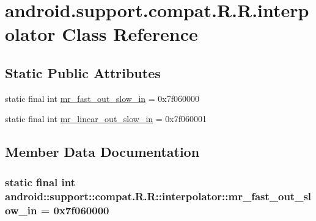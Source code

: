 \hypertarget{classandroid_1_1support_1_1compat_1_1_r_1_1interpolator}{
\section{android.support.compat.R.R.interpolator Class Reference}
\label{classandroid_1_1support_1_1compat_1_1_r_1_1interpolator}
}
\subsection*{Static Public Attributes}
\begin{CompactItemize}
\item 
static final int \hyperlink{classandroid_1_1support_1_1compat_1_1_r_1_1interpolator_52ad4986ccde81f2931c15de7df8a5e7}{mr\_\-fast\_\-out\_\-slow\_\-in} = 0x7f060000
\item 
static final int \hyperlink{classandroid_1_1support_1_1compat_1_1_r_1_1interpolator_29b54098a7f1c0c9c7e2aaf99c5793c7}{mr\_\-linear\_\-out\_\-slow\_\-in} = 0x7f060001
\end{CompactItemize}


\subsection{Member Data Documentation}
\hypertarget{classandroid_1_1support_1_1compat_1_1_r_1_1interpolator_52ad4986ccde81f2931c15de7df8a5e7}{
\subsubsection[{mr\_\-fast\_\-out\_\-slow\_\-in}]{\setlength{\rightskip}{0pt plus 5cm}static final int android::support::compat.R.R::interpolator::mr\_\-fast\_\-out\_\-slow\_\-in = 0x7f060000}}
\label{classandroid_1_1support_1_1compat_1_1_r_1_1interpolator_52ad4986ccde81f2931c15de7df8a5e7}



